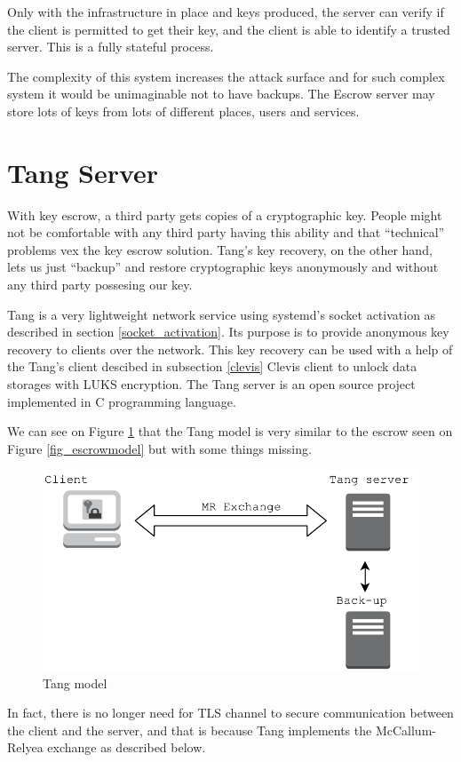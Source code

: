 Only with the infrastructure in place and keys produced, the server can verify if the client is permitted to get their key, and the client is able to identify a trusted server.
This is a fully stateful process.

The complexity of this system increases the attack surface and for such complex system it would be unimaginable not to have backups.
The Escrow server may store lots of keys from lots of different places, users and services.



\section{Tang Server}\label{tang}

With key escrow, a third party gets copies of a cryptographic key.
People might not be comfortable with any third party having this ability and that “technical” problems vex the key escrow solution.
Tang's key recovery, on the other hand, lets us just “backup” and restore cryptographic keys anonymously and without any third party possesing our key.

Tang is a very lightweight network service using systemd's socket activation as described in section \ref{socket_activation}.
Its purpose is to provide anonymous key recovery to clients over the network.
This key recovery can be used with a help of the Tang's client descibed in subsection \ref{clevis} Clevis client to unlock data storages with LUKS encryption.
The Tang server is an open source project implemented in C programming language.

We can see on Figure \ref{fig_tangmodel} that the Tang model is very similar to the escrow seen on Figure \ref{fig_escrowmodel} but with some things missing.
\begin{figure}[h]
    \centering
    \includegraphics[scale=0.7]{figures/TangModel.pdf}
    \caption{Tang model}
    \label{fig_tangmodel}
\end{figure}
In fact, there is no longer need for TLS channel to secure communication between the client and the server,
 and that is because Tang implements the McCallum-Relyea exchange as described below.

